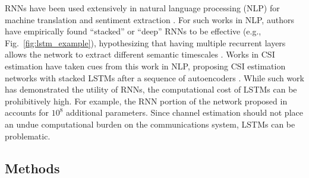 RNNs have been used extensively in natural language processing (NLP) for machine translation \cite{ref:Sutskever2014seq2seq} and sentiment extraction \cite{ref:Irsoy2014opinion}. For such works in NLP, authors have empirically found ``stacked'' or ``deep'' RNNs to be effective (e.g., Fig.~\ref{fig:lstm_example}), hypothesizing that having multiple recurrent layers allows the network to extract different semantic timescales \cite{ref:Irsoy2014opinion, ref:Bengio2009Learning}. Works in CSI estimation have taken cues from this work in NLP, proposing CSI estimation networks with stacked LSTMs after a sequence of autoencoders \cite{ref:Wang2019CsiNetLSTM}. While such work has demonstrated the utility of RNNs, the computational cost of LSTMs can be prohibitively high. For example, the RNN portion of the network proposed in \cite{ref:Wang2019CsiNetLSTM} accounts for $10^8$ additional parameters. Since channel estimation should not place an undue computational burden on the communications system, LSTMs can be problematic.

\subsection{Methods}

